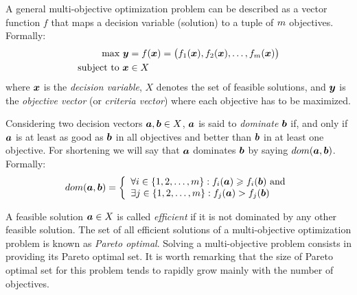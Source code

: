 A general multi-objective optimization problem can be described as a vector
function $f$ that maps a decision variable (solution) to a tuple
of $m$ objectives.
Formally:
\begin{align*}
  \text{max} ~ \boldsymbol{y} &= f(\boldsymbol{x}) =
    \big(f_1(\boldsymbol{x})
    ,f_2(\boldsymbol{x})
    ,\ldots
    ,f_{m}(\boldsymbol{x})\big) \\
  \text{subject to} ~ \boldsymbol{x} & \in X
\end{align*}
where $\boldsymbol{x}$ is the \emph{decision variable}, $X$ denotes the set
of feasible solutions, and $\boldsymbol{y}$ is the \emph{objective vector}
(or \emph{criteria vector}) where each objective has to be maximized.

Considering two decision vectors $\boldsymbol{a}, \boldsymbol{b} \in X$, $\boldsymbol{a}$ is said to
\emph{dominate} $\boldsymbol{b}$ if, and only if $\boldsymbol{a}$ is at least as good as $\boldsymbol{b}$
in all objectives and better than $\boldsymbol{b}$ in at least one objective.
For shortening we will say that $\boldsymbol{a}$ dominates $\boldsymbol{b}$ by saying $dom(\boldsymbol{a}, \boldsymbol{b})$.
Formally:
\begin{displaymath}
    dom(\boldsymbol{a}, \boldsymbol{b}) = \left\{
      \begin{array}{l}
          \forall i \in \{1, 2, \ldots, m\}: f_i(\boldsymbol{a}) \geqslant f_i(\boldsymbol{b}) ~\text{and}\\
          \exists j \in \{1, 2, \ldots, m\}: f_j(\boldsymbol{a}) > f_j(\boldsymbol{b})
  \end{array} \right.
\end{displaymath}

A feasible solution $\boldsymbol{a} \in X$ is called \emph{efficient} %
if it is not dominated by any other feasible solution.
The set of all efficient solutions of a multi-objective optimization problem is
known as \emph{Pareto optimal}.
Solving a multi-objective problem consists in providing its Pareto optimal set.
It is worth remarking that the size of Pareto optimal set for this problem
tends to rapidly grow mainly with the number of objectives. 


